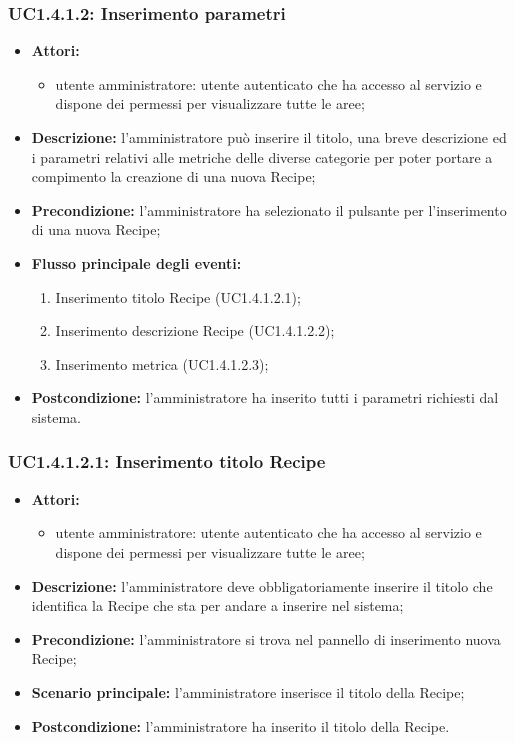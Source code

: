 \subsubsection{UC1.4.1.2: Inserimento parametri}
\begin{itemize}
	\item \textbf{Attori:}
	\begin{itemize}
		\item utente amministratore: utente autenticato che ha accesso al servizio e dispone dei permessi per visualizzare tutte le aree;
	\end{itemize}
	\item \textbf{Descrizione:} l'amministratore può inserire il titolo, una breve descrizione ed i parametri relativi alle metriche delle diverse categorie per poter portare a compimento la creazione di una nuova Recipe;
	\item \textbf{Precondizione:} l'amministratore ha selezionato il pulsante per l'inserimento di una nuova Recipe;
	\item \textbf{Flusso principale degli eventi:}
	\begin{enumerate}
		\item Inserimento titolo Recipe (UC1.4.1.2.1);
		\item Inserimento descrizione Recipe (UC1.4.1.2.2);
		\item Inserimento metrica (UC1.4.1.2.3);
	\end{enumerate}
	\item \textbf{Postcondizione:} l'amministratore ha inserito tutti i parametri richiesti dal sistema.
\end{itemize}

\subsubsection{UC1.4.1.2.1: Inserimento titolo Recipe}
\begin{itemize}
	\item \textbf{Attori:}
	\begin{itemize}
		\item utente amministratore: utente autenticato che ha accesso al servizio e dispone dei permessi per visualizzare tutte le aree;
	\end{itemize}
	\item \textbf{Descrizione:} l'amministratore deve obbligatoriamente inserire il titolo che identifica la Recipe che sta per andare a inserire nel sistema;
	\item \textbf{Precondizione:} l'amministratore si trova nel pannello di inserimento nuova Recipe;
	\item \textbf{Scenario principale:} l'amministratore inserisce il titolo della Recipe;
	\item \textbf{Postcondizione:} l'amministratore ha inserito il titolo della Recipe.
\end{itemize}

